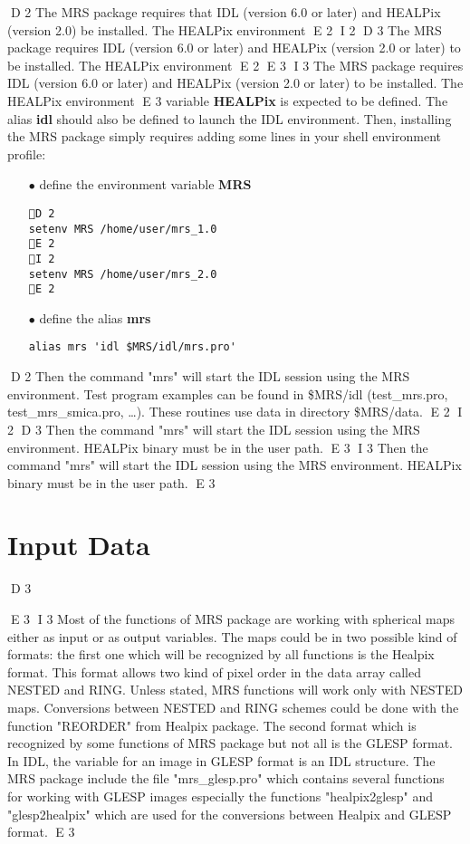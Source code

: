 D 2
The MRS package requires that IDL (version 6.0 or later) and HEALPix (version 2.0) be installed. The HEALPix environment 
E 2
I 2
D 3
The MRS package requires   IDL (version 6.0 or later) and HEALPix (version 2.0 or later) to be installed. The HEALPix environment 
E 2
E 3
I 3
The MRS package requires IDL (version 6.0 or later) and HEALPix (version 2.0 or later) to be installed. The HEALPix environment 
E 3
variable \textbf{HEALPix} is expected to be defined. The alias \textbf{idl} should also be defined to launch the IDL environment. 
Then, installing the MRS package simply requires adding some lines in your shell environment profile:
\begin{itemize}
\item[$\bullet$] {define the environment variable \textbf{MRS}}  
\begin{verbatim}
D 2
setenv MRS /home/user/mrs_1.0
E 2
I 2
setenv MRS /home/user/mrs_2.0
E 2
\end{verbatim}
 \item[$\bullet$]{define the alias \textbf{mrs}}  
\begin{verbatim}
alias mrs 'idl $MRS/idl/mrs.pro' 
\end{verbatim}
\end{itemize}
D 2
Then the command "mrs" will start the IDL session using the MRS environment. Test program examples can be found 
in \$MRS/idl (test\_mrs.pro, test\_mrs\_smica.pro, \dots). These routines use data in directory \$MRS/data.
E 2
I 2
D 3
Then the command "mrs" will start the IDL session using the MRS environment. 
 HEALPix binary must be in the user path.
E 3
I 3
Then the command "mrs" will start the IDL session using the MRS environment. HEALPix binary must be in the user path.
E 3
 
\section{Input Data}
D 3
  

E 3
I 3
Most of the functions of MRS package are working with spherical maps either as input or as output variables. The maps could be in 
two possible kind of formats: the first one which will be recognized by all functions is the Healpix format. This format allows 
two kind of pixel order in the data array called NESTED and RING. Unless stated, MRS functions will work only with NESTED maps. 
Conversions between NESTED and RING schemes could be done with the function "REORDER" from Healpix package. The second format which 
is recognized by some functions of MRS package but not all is the GLESP format. In IDL, the variable for an image in GLESP format 
is an IDL structure. The MRS package include the file "mrs\_glesp.pro" which contains several functions for working with GLESP images 
especially the functions "healpix2glesp" and "glesp2healpix" which are used for the conversions between Healpix and GLESP format.
E 3

